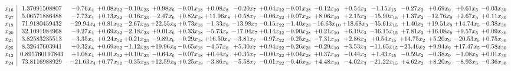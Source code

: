 \documentclass[9pt]{article}
\begin{document}
\[\begin{array}{c| c c@{\hskip 2pt} c@{\hskip 2pt} c@{\hskip 2pt} c@{\hskip 2pt} c@{\hskip 2pt} c@{\hskip 2pt} c@{\hskip 2pt} c@{\hskip 2pt} c@{\hskip 2pt} c@{\hskip 2pt} c@{\hskip 2pt} c@{\hskip 2pt} c@{\hskip 2pt} c@{\hskip 2pt} c@{\hskip 2pt} c@{\hskip 2pt} }
 x_{16}   &  1.37091508807 & -0.76 x_{4} & +  0.08 x_{32} & -0.10 x_{23} & +  0.98 x_{6} & -0.01 x_{18} & +  0.08 x_{8} & -0.20 x_{7} & +  0.04 x_{22} & -0.01 x_{28} & -0.12 x_{10} & +  0.54 x_{3} & -1.15 x_{15} & -0.27 x_{2} & +  0.69 x_{9} & +  0.61 x_{5} & -0.03 x_{30}\\
 x_{27}   &  5.06571886488 & -7.73 x_{4} & +  0.13 x_{32} & -0.16 x_{23} & -2.47 x_{6} & +  0.82 x_{18} & + 11.96 x_{8} & +  0.58 x_{7} & -0.06 x_{22} & +  0.07 x_{28} & +  8.06 x_{10} & +  2.15 x_{3} & -15.90 x_{15} & +  1.37 x_{2} & -12.76 x_{9} & +  2.67 x_{5} & +  0.11 x_{30}\\
 x_{19}   &  71.9180459432 & -29.94 x_{4} & +  0.81 x_{32} & -2.67 x_{23} & + 22.55 x_{6} & +  0.73 x_{18} & -1.33 x_{8} & -13.98 x_{7} & -0.15 x_{22} & -1.40 x_{28} & -16.63 x_{10} & + 18.68 x_{3} & -35.61 x_{15} & +  1.40 x_{2} & + 19.51 x_{9} & + 14.74 x_{5} & -0.38 x_{30}\\
 x_{20}   &  32.1091984968 & -9.27 x_{4} & +  0.69 x_{32} & -2.18 x_{23} & +  9.01 x_{6} & +  0.33 x_{18} & -5.73 x_{8} & -17.04 x_{7} & +  0.14 x_{22} & -0.90 x_{28} & +  0.21 x_{10} & +  6.19 x_{3} & -36.15 x_{15} & +  7.81 x_{2} & + 16.08 x_{9} & +  9.57 x_{5} & +  0.09 x_{30}\\
 x_{21}   &  3.82583235513 & -3.35 x_{4} & +  0.24 x_{32} & +  0.21 x_{23} & -9.89 x_{6} & -0.29 x_{18} & + 16.50 x_{8} & -3.81 x_{7} & -0.97 x_{22} & -0.25 x_{28} & -7.31 x_{10} & +  2.86 x_{3} & +  0.54 x_{15} & + 14.75 x_{2} & +  5.20 x_{9} & -20.53 x_{5} & +  0.75 x_{30}\\
 x_{25}   &  8.32647603941 & +  0.32 x_{4} & +  0.69 x_{32} & -1.12 x_{23} & + 19.96 x_{6} & -0.65 x_{18} & -4.57 x_{8} & +  5.30 x_{7} & +  0.94 x_{22} & -0.26 x_{28} & -0.29 x_{10} & +  3.53 x_{3} & -11.65 x_{15} & -23.46 x_{2} & +  9.94 x_{9} & + 17.47 x_{5} & -0.58 x_{30}\\
 x_{12}   &  0.895760197843 & +  1.08 x_{4} & +  0.01 x_{32} & +  0.10 x_{23} & -0.64 x_{6} & -0.07 x_{18} & +  0.44 x_{8} & +  0.35 x_{7} & -0.00 x_{22} & +  0.04 x_{28} & +  0.37 x_{10} & -0.44 x_{3} & +  1.43 x_{15} & -0.59 x_{2} & -0.38 x_{9} & -1.08 x_{5} & +  0.01 x_{30}\\
 x_{24}   &  73.8116988929 & -21.63 x_{4} & +  0.77 x_{32} & -0.35 x_{23} & + 12.59 x_{6} & +  0.25 x_{18} & -3.86 x_{8} & -5.58 x_{7} & -0.01 x_{22} & -0.46 x_{28} & +  4.48 x_{10} & -4.02 x_{3} & -21.22 x_{15} & +  4.62 x_{2} & +  8.20 x_{9} & -8.93 x_{5} & -0.36 x_{30}\\

\end{array}\]
\end{document}

